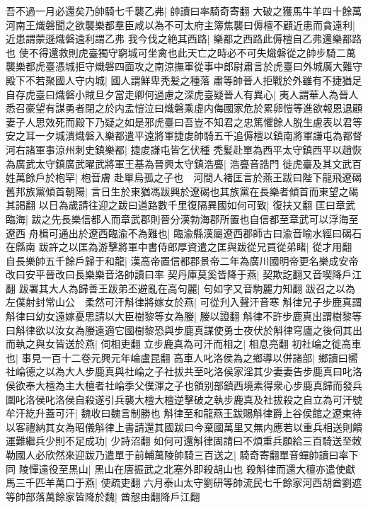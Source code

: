 吾不過一月必還矣乃帥騎七千襲乙弗|{
	帥讀曰率騎奇寄翻}
大破之獲馬牛羊四十餘萬河南王熾磐聞之欲襲樂都羣臣咸以為不可太府主簿焦襲曰傉檀不顧近患而貪遠利|{
	近患謂蒙遜熾磐遠利謂乙弗}
我今伐之絶其西路|{
	樂都之西路此傉檀自乙弗還樂都路也}
使不得還救則虎臺獨守窮城可坐禽也此天亡之時必不可失熾磐從之帥步騎二萬襲樂都虎臺憑城拒守熾磐四面攻之南涼撫軍從事中郎尉肅言於虎臺曰外城廣大難守殿下不若聚國人守内城|{
	國人謂鮮卑秃髪之種落}
肅等帥晉人拒戰於外雖有不捷猶足自存虎臺曰熾磐小賊旦夕當走卿何過慮之深虎臺疑晉人有異心|{
	夷人謂華人為晉人}
悉召豪望有謀勇者閉之於内孟愷泣曰熾磐乘虛内侮國家危於累卵愷等進欲報恩退顧妻子人思效死而殿下乃疑之如是邪虎臺曰吾豈不知君之忠篤懼餘人脱生慮表以君等安之耳一夕城潰熾磐入樂都遣平遠將軍捷䖍帥騎五千追傉檀以鎮南將軍謙屯為都督河右諸軍事涼州刺史鎮樂都|{
	捷䖍謙屯皆乞伏種}
秃髪赴單為西平太守鎮西平以趙恢為廣武太守鎮廣武曜武將軍王基為晉興太守鎮浩亹|{
	浩亹音誥門}
徙虎臺及其文武百姓萬餘戶於枹罕|{
	枹音膚}
赴單烏孤之子也　河間人褚匡言於燕王跋曰陛下龍飛遼碣舊邦族黨傾首朝陽|{
	言日生於東猶馮跋興於遼碣也其族黨在長樂者傾首而東望之碣其謁翻}
以日為歲請往迎之跋曰道路數千里復隔異國如何可致|{
	復扶又翻}
匡曰章武臨海|{
	跋之先長樂信都人而章武郡則晉分漢勃海郡所置也自信都至章武可以浮海至遼西}
舟楫可通出於遼西臨渝不為難也|{
	臨渝縣漢屬遼西郡師古曰渝音喻水經曰碣石在縣南}
跋許之以匡為游擊將軍中書侍郎厚資遣之匡與跋從兄買從弟睹|{
	從才用翻}
自長樂帥五千餘戶歸于和龍|{
	漢高帝置信都郡景帝二年為廣川國明帝更名樂成安帝改曰安平晉改曰長樂樂音洛帥讀曰率}
契丹庫莫奚皆降于燕|{
	契欺訖翻又音喫降戶江翻}
跋署其大人為歸善王跋弟丕避亂在高句麗|{
	句如字又音駒麗力知翻}
跋召之以為左僕射封常山公　柔然可汗斛律將嫁女於燕|{
	可從刋入聲汗音寒}
斛律兄子步鹿真謂斛律曰幼女遠嫁憂思請以大臣樹黎等女為媵|{
	媵以證翻}
斛律不許步鹿真出謂樹黎等曰斛律欲以汝女為媵遠適它國樹黎恐與步鹿真謀使勇士夜伏於斛律穹廬之後伺其出而執之與女皆送於燕|{
	伺相吏翻}
立步鹿真為可汗而相之|{
	相息亮翻}
初社崘之徙高車也|{
	事見一百十二卷元興元年崘盧昆翻}
高車人叱洛侯為之鄉導以併諸部|{
	鄉讀曰嚮}
社崘德之以為大人步鹿真與社崘之子社拔共至叱洛侯家淫其少妻妻告步鹿真曰叱洛侯欲奉大檀為主大檀者社崘季父僕渾之子也領别部鎮西境素得衆心步鹿真歸而發兵圍叱洛侯叱洛侯自殺遂引兵襲大檀大檀逆擊破之執步鹿真及社拔殺之自立為可汗號牟汗紇升蓋可汗|{
	魏收曰魏言制勝也}
斛律至和龍燕王跋賜斛律爵上谷侯館之遼東待以客禮納其女為昭儀斛律上書請還其國跋曰今棄國萬里又無内應若以重兵相送則饋運難繼兵少則不足成功|{
	少詩沼翻}
如何可還斛律固請曰不煩重兵願給三百騎送至敇勒國人必欣然來迎跋乃遣單于前輔萬陵帥騎三百送之|{
	騎奇寄翻單音蟬帥讀曰率下同}
陵憚遠役至黑山|{
	黑山在唐振武之北塞外即殺胡山也}
殺斛律而還大檀亦遣使獻馬三千匹羊萬口于燕|{
	使疏吏翻}
六月泰山太守劉研等帥流民七千餘家河西胡酋劉遮等帥部落萬餘家皆降於魏|{
	酋慤由翻降戶江翻}
